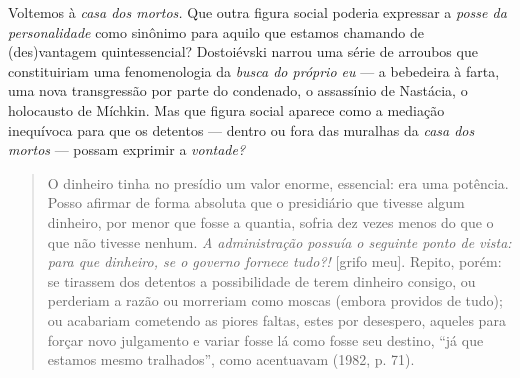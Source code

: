 Voltemos à \emph{casa dos mortos.} Que outra figura social poderia
expressar a \emph{posse da personalidade} como sinônimo para aquilo que
estamos chamando de (des)vantagem quintessencial? Dostoiévski narrou uma
série de arroubos que constituiriam uma fenomenologia da \emph{busca do
próprio eu} --- a bebedeira à farta, uma nova transgressão por parte do
condenado, o assassínio de Nastácia, o holocausto de Míchkin. Mas que
figura social aparece como a mediação inequívoca para que os detentos ---
dentro ou fora das muralhas da \emph{casa dos mortos} --- possam exprimir
a \emph{vontade?}

\begin{quote}
O dinheiro tinha no presídio um valor enorme, essencial: era uma
potência. Posso afirmar de forma absoluta que o presidiário que tivesse
algum dinheiro, por menor que fosse a quantia, sofria dez vezes menos do
que o que não tivesse nenhum. \emph{A administração possuía o seguinte
ponto de vista: para que dinheiro, se o governo fornece tudo?!} {[}grifo
meu{]}. Repito, porém: se tirassem dos detentos a possibilidade de terem
dinheiro consigo, ou perderiam a razão ou morreriam como moscas (embora
providos de tudo); ou acabariam cometendo as piores faltas, estes por
desespero, aqueles para forçar novo julgamento e variar fosse lá como
fosse seu destino, ``já que estamos mesmo tralhados'', como acentuavam
(1982, p. 71).
\end{quote}

